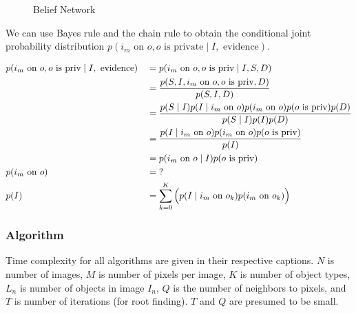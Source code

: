 \documentclass[11pt]{article}
\begin{document}
\begin{figure}[ht]
\centering
    \caption{Belief Network}\label{fig:belief}
\end{figure}

We can use Bayes rule and the chain rule to obtain the conditional joint probability distribution $p(i_m \textrm{ on } o, o \textrm{ is private} \mid I, \textrm{ evidence})$.

\begin{align}
    & p(i_m \textrm{ on } o, o \textrm{ is priv} \mid I, \textrm{ evidence})     && = p(i_m \textrm{ on } o, o \textrm{ is priv} \mid I, S, D) \notag\\
    & \quad && = \frac
        {p(S, I, i_m \textrm{ on } o, o \textrm{ is priv}, D)}
        {p(S, I, D)} \notag\\
    & \quad && = \frac
        {p(S \mid I) p(I \mid i_m \textrm{ on } o) p(i_m \textrm{ on } o) p(o \textrm{ is priv}) p(D)}
        {p(S \mid I) p(I) p(D)} \notag\\
    & \quad && = \frac
        {p(I \mid i_m \textrm{ on } o) p(i_m \textrm{ on } o) p(o \textrm{ is priv})}
        {p(I)} \label{eqn:joint}\\
    & \quad && = p(i_m \textrm{ on } o \mid I) p(o \textrm{ is priv}) \label{eqn:indep}\\
    & p(i_m \textrm{ on } o) 
        && = \textrm{?}\\
    & p(I)
        && = \sum_{k = 0}^{K} \Big( p(I \mid i_m \textrm{ on } o_k) p(i_m \textrm{ on } o_k) \Big)%
\end{align}%

\subsubsection{Algorithm}\label{sec:t1alg}

Time complexity for all algorithms are given in their respective captions.  $N$ is number of images, $M$ is number of pixels per image, $K$ is number of object types, $L_n$ is number of objects in image $I_n$, $Q$ is the number of neighbors to pixels, and $T$ is number of iterations (for root finding). $T$ and $Q$ are presumed to be small.
\end{document}
